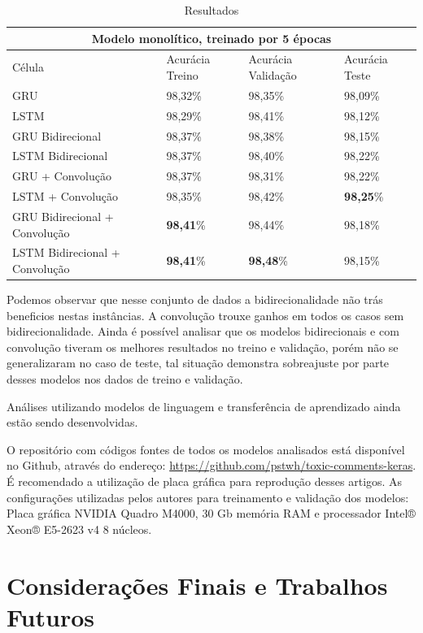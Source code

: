 \documentclass[12pt]{article}
\begin{document}
\begin{table}[!htb]
  \small
  \centering
  \renewcommand{\arraystretch}{1.15}
  \begin{tabular}{llll}
      \hline
      \multicolumn{4}{c}{Modelo monolítico, treinado por 5 épocas} \\
      \hline
    \hline
     Célula & Acurácia Treino & Acurácia Validação & Acurácia Teste \\
    GRU & 98,32\% & 98,35\% & 98,09\% \\
    LSTM & 98,29\% & 98,41\% & 98,12\% \\
    GRU Bidirecional & 98,37\% & 98,38\% & 98,15\% \\
    LSTM Bidirecional & 98,37\% & 98,40\% & 98,22\% \\
    GRU + Convolução & 98,37\% & 98,31\% & 98,22\% \\
    LSTM + Convolução & 98,35\% & 98,42\% & \textbf{98,25}\% \\
    GRU Bidirecional + Convolução & \textbf{98,41}\% & 98,44\% & 98,18\% \\
    LSTM Bidirecional + Convolução & \textbf{98,41}\% & \textbf{98,48}\% & 98,15\% \\
    \hline
  \end{tabular}
  \caption{Resultados}
  \label{tab:ptb}
\end{table}


Podemos observar que nesse conjunto de dados a bidirecionalidade não trás beneficios nestas instâncias. A convolução trouxe ganhos em todos os casos sem bidirecionalidade. Ainda é possível analisar que os modelos bidirecionais e com convolução tiveram os melhores resultados no treino e validação, porém não se generalizaram no caso de teste, tal situação demonstra sobreajuste por parte desses modelos nos dados de treino e validação.

Análises utilizando modelos de linguagem e transferência de aprendizado ainda estão sendo desenvolvidas.

O repositório com códigos fontes de todos os modelos analisados está disponível no Github, através do endereço: \url{https://github.com/pstwh/toxic-comments-keras}. É recomendado a utilização de placa gráfica para reprodução desses artigos. As configurações utilizadas pelos autores para treinamento e validação dos modelos: Placa gráfica NVIDIA Quadro M4000, 30 Gb memória RAM e processador Intel® Xeon® E5-2623 v4 8 núcleos.

\section{Considerações Finais e Trabalhos Futuros}
\end{document}
